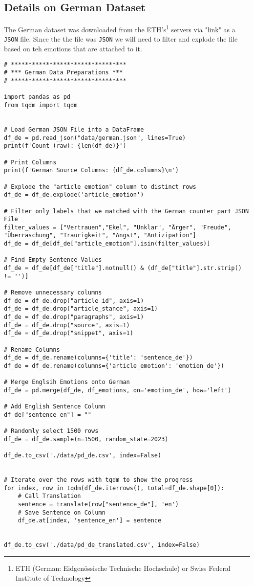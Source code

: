 \subsection{Details on German Dataset}
\label{appendix:dataset_german}
The German dataset was downloaded from the ETH's\footnote{ETH (German: Eidgenössische Technische Hochschule) or Swiss Federal Institute of Technology} servers via "link" as a \texttt{JSON} file. Since the the file was \texttt{JSON} we will need to filter and explode the file based on teh emotions that are attached to it.
\begin{verbatim}
# *********************************
# *** German Data Preparations ***
# *********************************

import pandas as pd
from tqdm import tqdm


# Load German JSON File into a DataFrame
df_de = pd.read_json("data/german.json", lines=True)
print(f'Count (raw): {len(df_de)}')

# Print Columns
print(f'German Source Columns: {df_de.columns}\n')

# Explode the "article_emotion" column to distinct rows
df_de = df_de.explode('article_emotion')

# Filter only labels that we matched with the German counter part JSON File
filter_values = ["Vertrauen","Ekel", "Unklar", "Ärger", "Freude", "Überraschung", "Traurigkeit", "Angst", "Antizipation"]
df_de = df_de[df_de["article_emotion"].isin(filter_values)]

# Find Empty Sentence Values
df_de = df_de[df_de["title"].notnull() & (df_de["title"].str.strip() != '')]

# Remove unnecessary columns
df_de = df_de.drop("article_id", axis=1)
df_de = df_de.drop("article_stance", axis=1)
df_de = df_de.drop("paragraphs", axis=1)
df_de = df_de.drop("source", axis=1)
df_de = df_de.drop("snippet", axis=1)

# Rename Columns
df_de = df_de.rename(columns={'title': 'sentence_de'})
df_de = df_de.rename(columns={'article_emotion': 'emotion_de'})

# Merge Englsih Emotions onto German
df_de = pd.merge(df_de, df_emotions, on='emotion_de', how='left')

# Add English Sentence Column
df_de["sentence_en"] = ""

# Randomly select 1500 rows
df_de = df_de.sample(n=1500, random_state=2023)

df_de.to_csv('./data/pd_de.csv', index=False)


# Iterate over the rows with tqdm to show the progress
for index, row in tqdm(df_de.iterrows(), total=df_de.shape[0]):
    # Call Translation
    sentence = translate(row["sentence_de"], 'en')
    # Save Sentence on Column
    df_de.at[index, 'sentence_en'] = sentence


df_de.to_csv('./data/pd_de_translated.csv', index=False)
\end{verbatim}
\clearpage
